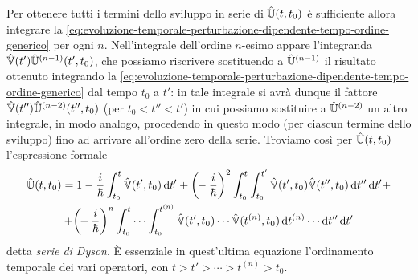 Per ottenere tutti i termini dello sviluppo in serie di $\hat{\mathbb U}(t,t_0)$ è sufficiente allora integrare la \eqref{eq:evoluzione-temporale-perturbazione-dipendente-tempo-ordine-generico} per ogni $n$.
Nell'integrale dell'ordine $n$-esimo appare l'integranda $\hat{\mathbb V}(t')\hat{\mathbb U}^{(n-1)}(t',t_0)$, che possiamo riscrivere sostituendo a $\hat{\mathbb U}^{(n-1)}$ il risultato ottenuto integrando la \eqref{eq:evoluzione-temporale-perturbazione-dipendente-tempo-ordine-generico} dal tempo $t_0$ a $t'$: in tale integrale si avrà dunque il fattore $\hat{\mathbb V}(t'')\hat{\mathbb U}^{(n-2)}(t'',t_0)$ (per $t_0<t''<t'$) in cui possiamo sostituire a $\hat{\mathbb U}^{(n-2)}$ un altro integrale, in modo analogo, procedendo in questo modo (per ciascun termine dello sviluppo) fino ad arrivare all'ordine zero della serie.
Troviamo cos\`i per $\hat{\mathbb U}(t,t_0)$ l'espressione formale
\begin{multline}
	\hat{\mathbb U}(t,t_0)=
	1
	-\frac{i}{\hbar}\int_{t_0}^t\hat{\mathbb V}(t',t_0)\,\textup{d} t'
	+\bigg(\!\!-\frac{i}{\hbar}\bigg)^2\int_{t_0}^t\int_{t_0}^{t'}\hat{\mathbb V}(t',t_0)\hat{\mathbb V}(t'',t_0)\,\textup{d} t''\,\textup{d} t'+\\
	+\bigg(\!\!-\frac{i}{\hbar}\bigg)^n\int_{t_0}^t\cdots\int_{t_0}^{t^{(n)}}\hat{\mathbb V}(t',t_0)\cdots\hat{\mathbb V}(t^{(n)},t_0)\,\textup{d} t^{(n)}\cdots\textup{d} t''\,\textup{d} t'
	\label{eq:serie-dyson}
\end{multline}
detta \emph{serie di Dyson}.
È essenziale in quest'ultima equazione l'ordinamento temporale dei vari operatori, con $t>t'>\cdots>t^{(n)}>t_0$.

